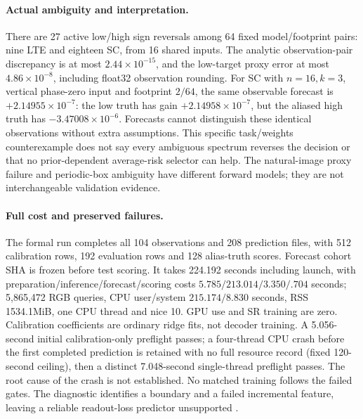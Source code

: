 \paragraph{Actual ambiguity and interpretation.}
There are 27 active low/high sign reversals among 64 fixed model/footprint pairs: nine LTE and eighteen SC, from 16 shared inputs. The analytic observation-pair discrepancy is at most $2.44\times10^{-15}$, and the low-target proxy error at most $4.86\times10^{-8}$, including float32 observation rounding. For SC with $n=16,k=3$, vertical phase-zero input and footprint $2/64$, the same observable forecast is $+2.14955\times10^{-7}$: the low truth has gain $+2.14958\times10^{-7}$, but the aliased high truth has $-3.47008\times10^{-6}$. Forecasts cannot distinguish these identical observations without extra assumptions. This specific task/weights counterexample does not say every ambiguous spectrum reverses the decision or that no prior-dependent average-risk selector can help. The natural-image proxy failure and periodic-box ambiguity have different forward models; they are not interchangeable validation evidence.

\paragraph{Full cost and preserved failures.}
The formal run completes all 104 observations and 208 prediction files, with 512 calibration rows, 192 evaluation rows and 128 alias-truth scores. Forecast cohort SHA is frozen before test scoring. It takes 224.192 seconds including launch, with preparation/inference/forecast/scoring costs $5.785/213.014/3.350/.704$ seconds; 5,865,472 RGB queries, CPU user/system $215.174/8.830$ seconds, RSS 1534.1MiB, one CPU thread and nice 10. GPU use and SR training are zero. Calibration coefficients are ordinary ridge fits, not decoder training. A 5.056-second initial calibration-only preflight passes; a four-thread CPU crash before the first completed prediction is retained with no full resource record (fixed 120-second ceiling), then a distinct 7.048-second single-thread preflight passes. The root cause of the crash is not established. No matched training follows the failed gates. The diagnostic identifies a boundary and a failed incremental feature, leaving a reliable readout-loss predictor unsupported .
